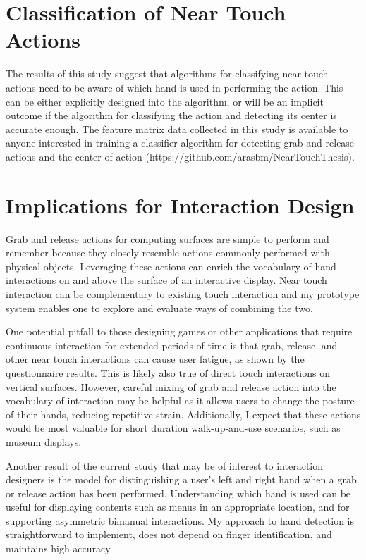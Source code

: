 \label{chapter:discussion}

\section{Classification of Near Touch Actions}
The results of this study suggest that algorithms for classifying near touch actions need to be aware of which hand is used in performing the action.
This can be either explicitly designed into the algorithm, or will be an implicit outcome if the algorithm for classifying the action and detecting its center is accurate enough.
The feature matrix data collected in this study is available to anyone
interested in training a classifier algorithm for detecting grab and release
actions and the center of action (https://github.com/arasbm/NearTouchThesis).

\section{Implications for Interaction Design}
Grab and release actions for computing surfaces are simple to perform and remember because they closely resemble actions commonly performed with physical objects.
Leveraging these actions can enrich the vocabulary of hand interactions on and above the surface of an interactive display.
Near touch interaction can be complementary to existing touch interaction and my prototype system enables one to explore and evaluate ways of combining the two.

One potential pitfall to those designing games or other applications that require continuous interaction for extended periods of time is that grab, release, and other near touch interactions can cause user fatigue, as shown by the questionnaire results. This is likely also true of direct touch interactions on vertical surfaces.
However, careful mixing of grab and release action into the vocabulary of interaction may be helpful as it allows users to change the posture of their hands, reducing repetitive strain.
Additionally, I expect that these actions would be most valuable for short duration walk-up-and-use scenarios, such as museum displays.

Another result of the current study that may be of interest to interaction designers is the model for distinguishing a user's left and right hand when a grab or release action has been performed. Understanding which hand is used can be useful for displaying contents such as menus in an appropriate location, and for supporting asymmetric bimanual interactions. My approach to hand detection is straightforward to implement, does not depend on finger identification, and maintains high accuracy.

